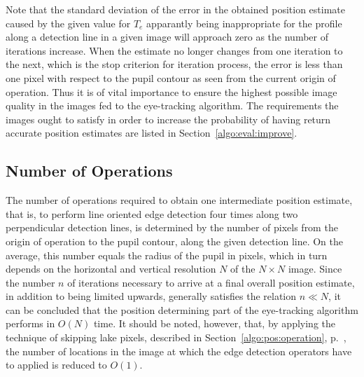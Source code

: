 Note that the standard deviation of the error in the obtained position
estimate caused by the given value for $T_{e}$ apparantly being
inappropriate for the profile along a detection line in a given image
will approach zero as the number of iterations increase.  When the
estimate no longer changes from one iteration to the next, which is
the stop criterion for iteration process, the error is less than one
pixel with respect to the pupil contour as seen from the current
origin of operation.  Thus it is of vital importance to ensure the
highest possible image quality in the images fed to the {\octopus}
eye-tracking algorithm.  The requirements the images ought to satisfy
in order to increase the probability of having {\octopus} return
accurate position estimates are listed in
Section~\ref{algo:eval:improve}.

\subsection{Number of Operations}
\label{algo:pos:O}

The number of operations required to obtain one intermediate position
estimate, that is, to perform line oriented edge detection four times
along two perpendicular detection lines, is determined by the number
of pixels from the origin of operation to the pupil contour, along the
given detection line.  On the average, this number equals the radius
of the pupil in pixels, which in turn depends on the horizontal and
vertical resolution $N$ of the $N\times N$ image.  Since the number
$n$ of iterations necessary to arrive at a final overall position
estimate, in addition to being limited upwards, generally satisfies
the relation $n\ll N$, it can be concluded that the position
determining part of the {\octopus} eye-tracking algorithm performs in
$O(N)$ time.  It should be noted, however, that, by applying the
technique of skipping lake pixels, described in
Section~\ref{algo:pos:operation}, p.~\pageref{pg:skiplakepixels}, the
number of locations in the image at which the edge detection operators
have to applied is reduced to $O(1)$.
